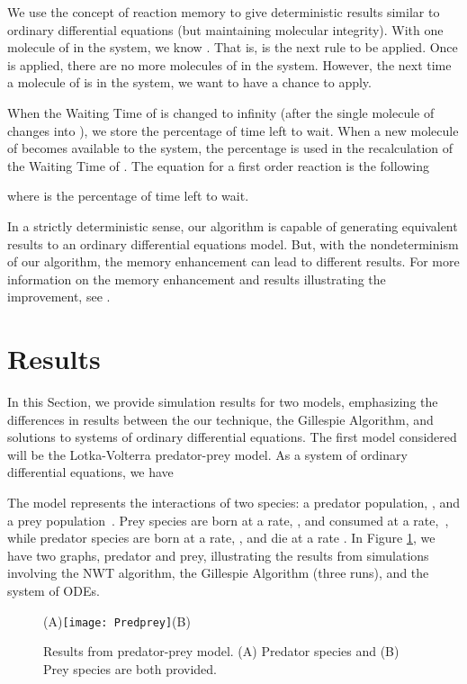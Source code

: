 \documentclass[copyright]{eptcs}
\newcommand{\noi}{\noindent}
\begin{document}
We use the concept of reaction memory to give deterministic results similar to ordinary 
differential equations (but maintaining molecular integrity).  With one molecule of  
in the system, we know \hbox{}.  That is,  is the next rule to be 
applied.  Once  is applied, there are no more molecules of  in the system.  
However, the next time a molecule of  is in the system, we want  to have a chance 
to apply.

When the Waiting Time of  is changed to infinity (after the single molecule of  changes into ), we store the percentage of time left to wait.  When a new molecule of  becomes available to the system, the percentage is used in the recalculation of the Waiting Time of .  The equation for a first order reaction is the following

\noi where  is the percentage of time left to wait.


In a strictly deterministic sense, our algorithm is capable of generating equivalent results to an ordinary differential equations model.  But, with the nondeterminism of our algorithm, the memory enhancement can lead to different results.  For more information on the memory enhancement and results illustrating the improvement, see \cite{jack09}.

\section{Results}\label{results}

In this Section, we provide simulation results for two models, emphasizing the differences 
in results between the our technique, the Gillespie Algorithm, and solutions to systems of
ordinary differential equations.  The first model considered will be the Lotka-Volterra 
predator-prey model.  As a system of ordinary differential equations, we have


The model represents the interactions of two species: a predator population, , and a 
prey population~.  Prey species are born at a rate, , and consumed at a rate,~, 
while predator species are born at a rate, , and die at a rate .  
In Figure \ref{predprey}, we have two graphs, predator and prey, illustrating the results 
from simulations involving the NWT algorithm, the Gillespie Algorithm (three runs), and the 
system of ODEs.

\begin{figure}[ht]
\centering
(A)\texttt{[image: Predprey]}(B)
\caption{Results from predator-prey model.  (A) Predator species and (B) Prey species are both provided.}
\label{predprey}
\end{figure}
\end{document}
